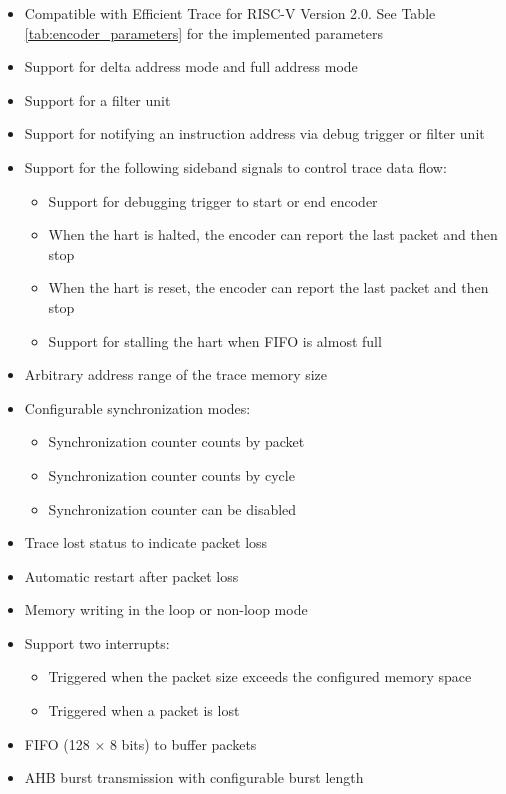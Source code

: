 \documentclass[main\_\_EN.tex]{subfiles}
\begin{document}
\begin{itemize}
    \item Compatible with Efficient Trace for RISC-V Version 2.0. See Table \ref{tab:encoder_parameters} for the implemented parameters
    \item Support for delta address mode and full address mode
    \item Support for a filter unit
    \item Support for notifying an instruction address via debug trigger or filter unit
    \item Support for the following sideband signals to control trace data flow:
        \begin{itemize}
            \item Support for debugging trigger to start or end encoder
            \item When the hart is halted, the encoder can report the last packet and then stop
            \item When the hart is reset, the encoder can report the last packet and then stop
            \item Support for stalling the hart when FIFO is almost full
        \end{itemize}
    \item Arbitrary address range of the trace memory size
    \item Configurable synchronization modes:
        \begin{itemize}
            \item Synchronization counter counts by packet
            \item Synchronization counter counts by cycle
            \item Synchronization counter can be disabled
        \end{itemize}
    \item Trace lost status to indicate packet loss
    \item Automatic restart after packet loss
    \item Memory writing in the loop or non-loop mode
    \item Support two interrupts:
        \begin{itemize}
            \item Triggered when the packet size exceeds the configured memory space
            \item Triggered when a packet is lost
        \end{itemize}
    \item FIFO (128 × 8 bits) to buffer packets
    \item AHB burst transmission with configurable burst length
\end{itemize}
\end{document}
